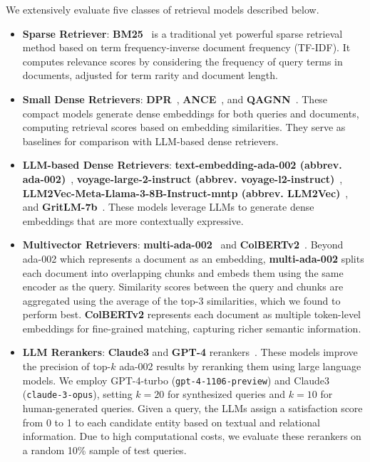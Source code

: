 We extensively evaluate five classes of retrieval models described below.
\vspace{-5pt}
\begin{itemize}[leftmargin=*]
    \vspace{-1pt}   
    \item \textbf{Sparse Retriever}: \textbf{BM25}~\cite{bm25} is a traditional yet powerful sparse retrieval method based on term frequency-inverse document frequency (TF-IDF). It computes relevance scores by considering the frequency of query terms in documents, adjusted for term rarity and document length.
    
    \vspace{-1pt}   
    \item \textbf{Small Dense Retrievers}: \textbf{DPR}~\cite{dpr}, \textbf{ANCE}~\cite{ance}, and \textbf{QAGNN}~\cite{qagnn}. These compact models generate dense embeddings for both queries and documents, computing retrieval scores based on embedding similarities. They serve as baselines for comparison with LLM-based dense retrievers.
    
    \vspace{-1pt}   
    \item \textbf{LLM-based Dense Retrievers}: \textbf{text-embedding-ada-002 (abbrev. ada-002)}~\cite{oai}, \textbf{voyage-large-2-instruct (abbrev. voyage-l2-instruct)}~\cite{voyage}, \textbf{LLM2Vec-Meta-Llama-3-8B-Instruct-mntp (abbrev. LLM2Vec)}~\cite{llm2vec}, and \textbf{GritLM-7b}~\cite{GritLM}. These models leverage LLMs to generate dense embeddings that are more contextually expressive.
    
    \vspace{-1pt}   
    \item \textbf{Multivector Retrievers}: \textbf{multi-ada-002}~\cite{oai} and \textbf{ColBERTv2}~\cite{ColBERTv2}. Beyond ada-002 which represents a document as an embedding, \textbf{multi-ada-002} splits each document into overlapping chunks and embeds them using the same encoder as the query. Similarity scores between the query and chunks are aggregated using the average of the top-3 similarities, which we found to perform best. \textbf{ColBERTv2} represents each document as multiple token-level embeddings for fine-grained matching, capturing richer semantic information.
    
    \vspace{-1pt}   
    \item \textbf{LLM Rerankers}: \textbf{Claude3} and \textbf{GPT-4} rerankers~\cite{abs-2306-04757, abs-2310-14122}. These models improve the precision of top-$k$ ada-002 results by reranking them using large language models. We employ GPT-4-turbo (\texttt{gpt-4-1106-preview}) and Claude3 (\texttt{claude-3-opus}), setting $k=20$ for synthesized queries and $k=10$ for human-generated queries. Given a query, the LLMs assign a satisfaction score from 0 to 1 to each candidate entity based on textual and relational information. Due to high computational costs, we evaluate these rerankers on a random 10\% sample of test queries.
\end{itemize}

